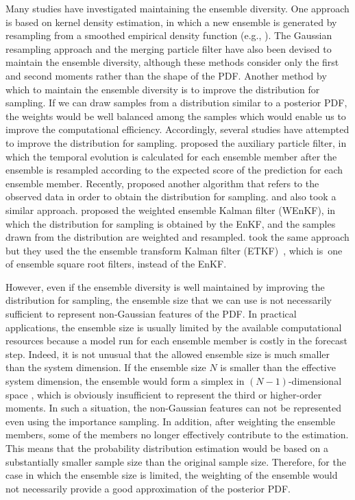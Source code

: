\documentclass[useAMS,usenatbib]{tellus}
\begin{document}
Many studies have investigated maintaining the ensemble diversity.
One approach is based on kernel density estimation,
in which a new ensemble is generated by resampling from a smoothed
empirical density function (e.g., \citealp{mus+al2001}).
The Gaussian resampling approach \citep{kotdju2003,xio+al2006}
and the merging particle filter \citep{nak+al2007}
have also been devised to maintain the ensemble diversity,
although these methods consider only the first and second moments
rather than the shape of the PDF.
Another method by which to maintain the ensemble diversity
is to improve the distribution for sampling.
If we can draw samples from a distribution similar to a posterior PDF,
the weights would be well balanced among the samples
which would enable us to improve the computational efficiency.
Accordingly, several studies have attempted to improve
the distribution for sampling.
\cite{pitshe1999} proposed the auxiliary particle filter,
in which the temporal evolution is calculated for each ensemble member
after the ensemble is resampled according to the expected score of
the prediction for each ensemble member.
Recently, \cite{lee2010,lee2011} proposed another algorithm that refers to
the observed data in order to obtain the distribution for sampling.
\cite{cho+al2010} and \cite{mor+al2012} also took a similar approach.
\cite{pap+al2010} proposed the weighted ensemble Kalman filter (WEnKF),
in which the distribution for sampling is obtained by the EnKF,
and the samples drawn from the distribution are weighted and resampled.
\cite{bey+al2013} took the same approach but they used the
the ensemble transform Kalman filter (ETKF)~\citep{bis+al2001,wanx+al2004}, which is~one of ensemble square
root filters, instead of the EnKF.

However, even if the ensemble diversity is well maintained by
improving the distribution for sampling,
the ensemble size that we can use is not necessarily sufficient to
represent non-Gaussian features of the PDF.
In practical applications, the ensemble size is usually limited
by the available computational resources because a model run for each ensemble
member is costly in the forecast step. Indeed, it is not unusual
that the allowed ensemble size is much smaller than the system dimension.
If the ensemble size $N$ is smaller than the effective system dimension,
the ensemble would form a simplex in $(N-1)$-dimensional space
\citep{jul2003,wanx+al2004}, which is obviously insufficient to represent
the third or higher-order moments.
In such a situation, the non-Gaussian features
can not be represented even using the importance sampling.
In addition, after weighting the ensemble members,
some of the members no longer effectively contribute to the estimation.
This means that the probability distribution estimation would
be based on a substantially smaller sample size than the original sample
size. Therefore, for the case in which the ensemble size is limited,
the weighting of the ensemble would
not necessarily provide a good approximation of the posterior PDF.
\end{document}
